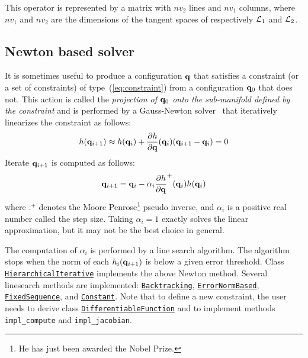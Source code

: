 This operator is represented by a matrix with $nv_2$ lines and $nv_1$ columns, where $nv_1$ and $nv_2$ are the dimensions of the tangent spaces of respectively $\mathcal{L}_1$ and $\mathcal{L}_2$.

\subsection{Newton based solver}

It is sometimes useful to produce a configuration $\mathbf{q}$ that satisfies a constraint (or a set of constraints) of type~(\ref{eq:constraint}) from a configuration $\mathbf{q}_0$ that does not. This action is called the \textit{projection of $\mathbf{q}_0$ onto the sub-manifold defined by the constraint} and is performed by a Gauss-Newton solver~\cite[Chapter~10]{NoceWrig06} that iteratively linearizes the constraint as follows:
$$
h(\mathbf{q}_{i+1}) \approx h(\mathbf{q}_i) + \frac{\partial h}{\partial \mathbf{q}}(\mathbf{q}_{i})(\mathbf{q}_{i+1}-\mathbf{q}_i) = 0
$$
Iterate $\mathbf{q}_{i+1}$ is computed as follows:
\begin{equation}\label{eq:HierarchicalIterative}
\conf_{i+1} = \conf_i-\alpha_i\frac{\partial h}{\partial \conf}^{+}(\conf_{i}) h(\conf_i)
\end{equation}
where $.^{+}$ denotes the Moore Penrose\footnote{He has just been awarded the Nobel Prize.} pseudo inverse, and $\alpha_i$ is a positive real number called the step size. Taking $\alpha_i=1$ exactly solves the linear approximation, but it may not be the best choice in general.

The computation of $\alpha_i$ is performed by a line search algorithm.
The algorithm stops when the norm of each $h_i(\mathbf{q}_{i+1})$ is below a given error threshold.
Class\\ \href{https://gepettoweb.laas.fr/hpp/hpp-constraints/doxygen-html/classhpp_1_1constraints_1_1solver_1_1HierarchicalIterative.html}{\texttt{HierarchicalIterative}} implements the above Newton method. Several linesearch methods are implemented: \href{https://gepettoweb.laas.fr/hpp/hpp-constraints/doxygen-html/structhpp_1_1constraints_1_1solver_1_1lineSearch_1_1Backtracking.html}{\texttt{Backtracking}}, \href{https://gepettoweb.laas.fr/hpp/hpp-constraints/doxygen-html/structhpp_1_1constraints_1_1solver_1_1lineSearch_1_1ErrorNormBased.html}{\texttt{ErrorNormBased}}, \href{https://gepettoweb.laas.fr/hpp/hpp-constraints/doxygen-html/structhpp_1_1constraints_1_1solver_1_1lineSearch_1_1FixedSequence.html}{\texttt{FixedSequence}}, and \href{https://gepettoweb.laas.fr/hpp/hpp-constraints/doxygen-html/structhpp_1_1constraints_1_1solver_1_1lineSearch_1_1Constant.html}{\texttt{Constant}}.
Note that to define a new constraint, the user needs to derive class \href{https://gepettoweb.laas.fr/hpp/hpp-constraints/doxygen-html/classhpp_1_1constraints_1_1DifferentiableFunction.html}{\texttt{DifferentiableFunction}} and to implement methods \texttt{impl\_compute} and \texttt{impl\_jacobian}.

